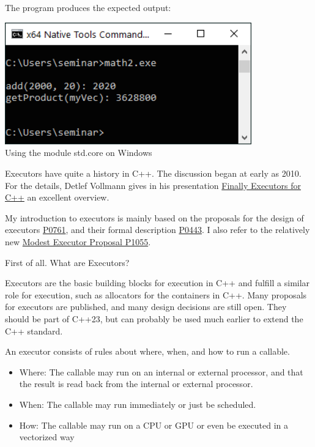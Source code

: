The program produces the expected output:

\begin{center}
\includegraphics[width=0.8\textwidth]{content/5/chapter8/images/7.png}\\
Using the module std.core on Windows
\end{center}


Executors have quite a history in C++. The discussion began at early as 2010. For the details, Detlef Vollmann gives in his presentation \href{http://www.vollmann.ch/en/presentations/executors2018.pdf}{Finally Executors for C++} an excellent overview.

My introduction to executors is mainly based on the proposals for the design of executors \href{http://www.open-std.org/jtc1/sc22/wg21/docs/papers/2018/p0761r2.pdf}{P0761}, and their formal description \href{http://open-std.org/JTC1/SC22/WG21/docs/papers/2018/p0443r7.html}{P0443}. I also refer to the relatively new \href{http://open-std.org/JTC1/SC22/WG21/docs/papers/2018/p1055r0.pdf}{Modest Executor Proposal P1055}.

First of all. What are Executors?

Executors are the basic building blocks for execution in C++ and fulfill a similar role for execution, such as allocators for the containers in C++. Many proposals for executors are published, and many design decisions are still open. They should be part of C++23, but can probably be used much earlier to extend the C++ standard.

An executor consists of rules about where, when, and how to run a callable.

\begin{itemize}
\item 
Where: The callable may run on an internal or external processor, and that the result is read back from the internal or external processor.

\item 
When: The callable may run immediately or just be scheduled.

\item 
How: The callable may run on a CPU or GPU or even be executed in a vectorized way
\end{itemize}

